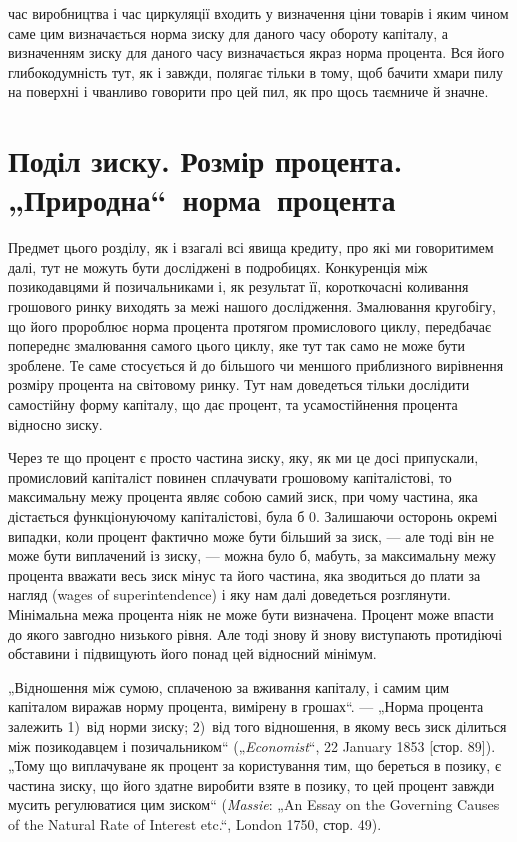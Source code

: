 \parcont{}  %
час виробництва і час циркуляції входить у визначення ціни
товарів і яким чином саме цим визначається норма зиску для
даного часу обороту капіталу, а визначенням зиску для даного
часу визначається якраз норма процента. Вся його глибокодумність
тут, як і завжди, полягає тільки в тому, щоб бачити хмари
пилу на поверхні і чванливо говорити про цей пил, як про щось
таємниче й значне.

\section{Поділ зиску. Розмір процента.
„Природна“~норма~процента}

Предмет цього розділу, як і взагалі всі явища кредиту, про
які ми говоритимем далі, тут не можуть бути досліджені в подробицях.
Конкуренція між позикодавцями й позичальниками і,
як результат її, короткочасні коливання грошового ринку виходять
за межі нашого дослідження. Змалювання кругобігу, що
його пророблює норма процента протягом промислового циклу,
передбачає попереднє змалювання самого цього циклу, яке тут
так само не може бути зроблене. Те саме стосується й до більшого
чи меншого приблизного вирівнення розміру процента
на світовому ринку. Тут нам доведеться тільки дослідити самостійну
форму капіталу, що дає процент, та усамостійнення процента
відносно зиску.

Через те що процент є просто частина зиску, яку, як ми
це досі припускали, промисловий капіталіст повинен сплачувати
грошовому капіталістові, то максимальну межу процента
являє собою самий зиск, при чому частина, яка дістається функціонуючому
капіталістові, була б \deq{} 0. Залишаючи осторонь окремі
випадки, коли процент фактично може бути більший за зиск, —
але тоді він не може бути виплачений із зиску, — можна було б,
мабуть, за максимальну межу процента вважати весь зиск мінус
та його частина, яка зводиться до плати за нагляд (wages
of superintendence) і яку нам далі доведеться розглянути. Мінімальна
межа процента ніяк не може бути визначена. Процент
може впасти до якого завгодно низького рівня. Але тоді знову
й знову виступають протидіючі обставини і підвищують його
понад цей відносний мінімум.

„Відношення між сумою, сплаченою за вживання капіталу,
і самим цим капіталом виражав норму процента, вимірену в
грошах“. — „Норма процента залежить 1)~від норми зиску; 2)~від
того відношення, в якому весь зиск ділиться між позикодавцем
і позичальником“ („\emph{Economist}“, 22 January 1853 [стор. 89]). „Тому
що виплачуване як процент за користування тим, що береться в
позику, є частина зиску, що його здатне виробити взяте в позику,
то цей процент завжди мусить регулюватися цим зиском“
(\emph{Massie}: „An Essay on the Governing Causes of the Natural Rate of
Interest etc.“, London 1750, стор. 49).
